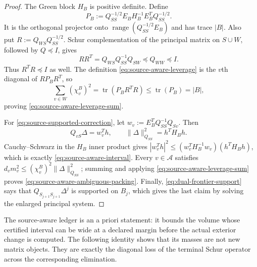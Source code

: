 \begin{proof}
The Green block $H_B$ is positive definite.  Define
\begin{equation*}
 P_B:=Q_{SS}^{-1/2}E_BH_B^{-1}E_B^TQ_{SS}^{-1/2}.
\end{equation*}
It is the orthogonal projector onto
$\operatorname{range}(Q_{SS}^{-1/2}E_B)$ and has trace $|B|$.
Also put $R:=Q_{WS}Q_{SS}^{-1/2}$.  Schur complementation of the principal
matrix on $S\cup W$, followed by $Q\preceq I$, gives
\begin{equation}
 RR^T=Q_{WS}Q_{SS}^{-1}Q_{SW}\preceq Q_{WW}\preceq I.
 \label{eq:exterior-response-contraction}
\end{equation}
Thus $R^TR\preceq I$ as well.  The definition
\cref{eq:source-aware-leverage} is the $v$th diagonal of $RP_BR^T$, so
\begin{equation*}
 \sum_{v\in W}(\chi_v^B)^2
 =\operatorname{tr}(P_BR^TR)
 \leq\operatorname{tr}(P_B)=|B|,
\end{equation*}
proving \cref{eq:source-aware-leverage-sum}.

For \cref{eq:source-supported-correction}, let
$w_v:=E_B^TQ_{SS}^{-1}Q_{Sv}$.  Then
\begin{equation*}
 Q_{vS}\Delta=w_v^Th,
 \qquad
 \|\Delta\|_{Q_{SS}}^2=h^TH_Bh.
\end{equation*}
Cauchy--Schwarz in the $H_B$ inner product gives
$|w_v^Th|^2\leq(w_v^TH_B^{-1}w_v)(h^TH_Bh)$, which is exactly
\cref{eq:source-aware-interval}.  Every $v\in\mathcal A$ satisfies
$d_vm_v^2\leq(\chi_v^B)^2\|\Delta\|_{Q_{SS}}^2$; summing and applying
\cref{eq:source-aware-leverage-sum} proves
\cref{eq:source-aware-ambiguous-packing}.  Finally,
\cref{eq:dual-frontier-support} says that
$Q_{S_{j+1}S_{j+1}}\Delta^j$ is supported on $B_j$, which gives the last
claim by solving the enlarged principal system.
\end{proof}

The source-aware ledger is an a priori statement: it bounds the volume whose
certified interval can be wide at a declared margin before the actual exterior
change is computed.  The following identity shows that its masses are not new
matrix objects.  They are exactly the diagonal loss of the terminal Schur
operator across the corresponding elimination.


